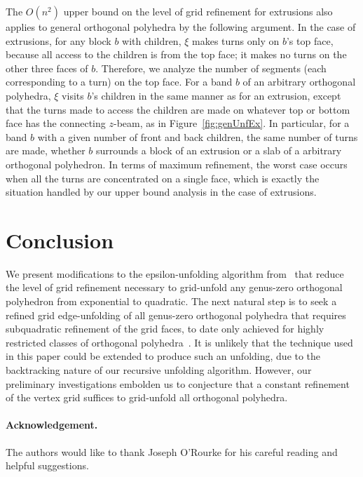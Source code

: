 \documentclass[11pt]{article}
\begin{document}
The $O(n^2)$ upper bound on the level of grid refinement for extrusions also applies to general orthogonal polyhedra by the following argument. In the case of extrusions, for any block $b$ with children, $\xi$ makes turns only
on $b$'s top face, because all access to the children is
from the top face; it makes no turns on the other three faces of $b$.
Therefore, we analyze the
number of segments (each corresponding to a turn) on the top face. For a band $b$
of an arbitrary orthogonal polyhedra, $\xi$ visits $b$'s children in the same manner as for
an extrusion, except that the turns made to access the children are made
on whatever top or bottom face has the connecting $z$-beam, as in Figure~\ref{fig:genUnfEx}. In particular, for a band $b$ with a given number
of front and back children, the same number of turns are made, whether
$b$ surrounds a block of an extrusion or a slab of a arbitrary orthogonal polyhedron.
In terms of maximum refinement, the worst case occurs when all the turns are
concentrated on a single face, which is exactly the situation handled by our upper bound
analysis in the case of extrusions.


\section{Conclusion}
We present modifications to the epsilon-unfolding algorithm from~\cite{Damian-Flatland-O'Rourke-2007-epsilon} that reduce the level of grid
refinement necessary to grid-unfold any
genus-zero orthogonal polyhedron from exponential to quadratic.
The next natural step is to seek a refined grid edge-unfolding of all genus-zero
orthogonal polyhedra that requires subquadratic refinement of the
grid faces, to date only achieved for highly restricted classes of
orthogonal polyhedra~\cite{Biedl-Demaine-Demaine-Lubiw-Overmars-O'Rourke-Robbins-Whitesides-1998,Damian-Flatland-O'Rourke-2008-manhattan,Damian-Meijer-2004-orthostacks}.
It is unlikely
that the technique used in this paper could be extended to produce such an unfolding, due
to the backtracking nature of our recursive unfolding algorithm. However, our preliminary
investigations embolden us
to conjecture that a constant refinement of the vertex grid
suffices to grid-unfold all orthogonal polyhedra.


\paragraph{Acknowledgement.} The authors would like to thank Joseph O'Rourke for his careful 
reading and helpful suggestions.



\end{document}
